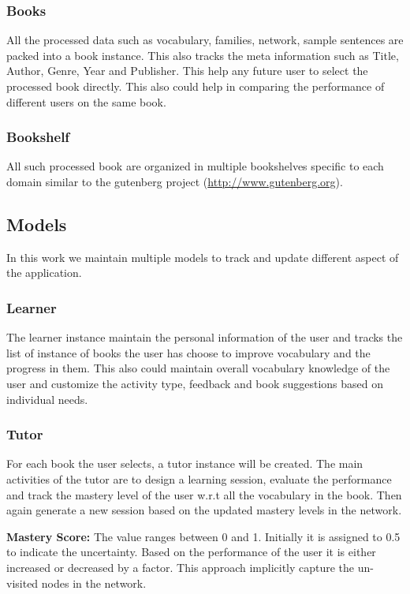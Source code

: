 \documentclass[11pt,a4paper]{article}
\begin{document}
\subsubsection{Books}
All the processed data such as vocabulary, families, network, sample sentences
are packed into a book instance. This also tracks the meta information such as
Title, Author, Genre, Year and Publisher. This help any future user to select
the processed book directly. This also could help in comparing the performance
of different users on the same book.

\subsubsection{Bookshelf}
All such processed book are organized in multiple bookshelves specific to each
domain similar to the gutenberg project (\url{http://www.gutenberg.org}).

\subsection{Models}
In this work we maintain multiple models to track and update different aspect
of the application.

\subsubsection{Learner}
The learner instance maintain the personal information of the user and tracks
the list of instance of books the user has choose to improve vocabulary and the
progress in them. This also could maintain overall vocabulary knowledge of
the user and customize the activity type, feedback and book suggestions based
on individual needs.

\subsubsection{Tutor}
For each book the user selects, a tutor instance will be created. The main
activities of the tutor are to design a learning session, evaluate the
performance and track the mastery level of the user w.r.t all the vocabulary
in the book. Then again generate a new session based on the updated mastery
levels in the network.

\textbf{Mastery Score:} The value ranges between 0 and 1. Initially it is
assigned to 0.5 to indicate the uncertainty. Based on the performance of the
user it is either increased or decreased by a factor. This approach implicitly
capture the un-visited nodes in the network.
\end{document}
